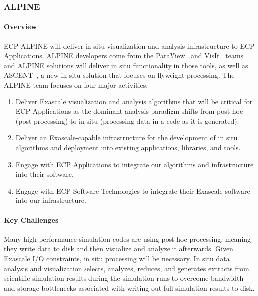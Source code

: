 \subsubsection{ ALPINE} 


\paragraph{Overview} 

ECP ALPINE will deliver in situ visualization and analysis infrastructure to ECP Applications.  
%
ALPINE developers come from the ParaView~\cite{paraview1,paraview2} and VisIt~\cite{VisIt} teams and ALPINE solutions will deliver in situ functionality in those tools, as
well as ASCENT~\cite{ASCENT}, a new in situ solution that focuses on flyweight processing. 
%
The ALPINE team focuses on four major activities: 
\begin{enumerate}
        \setlength{\itemsep}{1pt}
        \setlength{\parskip}{0pt}
        \setlength{\parsep}{0pt}
\item Deliver Exascale visualization and analysis algorithms that will be critical for ECP Applications as the dominant analysis paradigm shifts from post hoc (post-processing) to in situ (processing data in a code as it is generated). 
\item Deliver an Exascale-capable infrastructure for the development of in situ algorithms and deployment into existing applications, libraries, and tools. 
\item Engage with ECP Applications to integrate our algorithms and infrastructure into their software. 
\item Engage with ECP Software Technologies to integrate their Exascale software into our infrastructure. 
\end{enumerate}


\paragraph{Key  Challenges}

Many high performance simulation codes are using post hoc processing, meaning they write data to disk and then visualize and analyze it afterwards. 
%
Given Exascale I/O constraints, in situ processing will be necessary. 
%
In situ data analysis and visualization selects, analyzes, reduces, and generates extracts from scientific simulation results during the simulation runs to overcome bandwidth and storage bottlenecks associated with writing out full simulation results to disk. 

